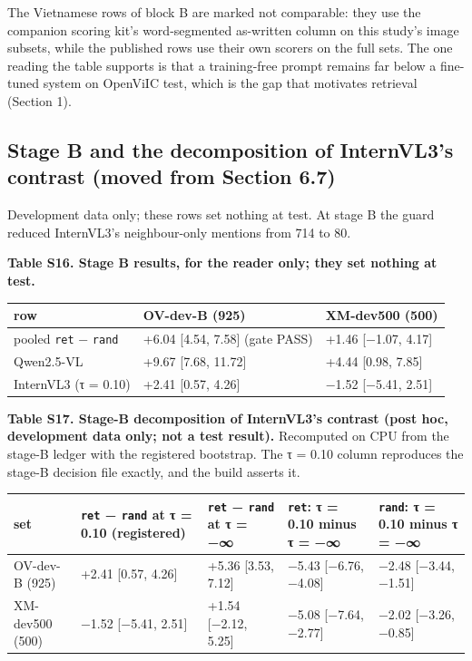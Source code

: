 The Vietnamese rows of block B are marked not comparable: they use the companion scoring kit's
word-segmented as-written column on this study's image subsets, while the published rows use their
own scorers on the full sets. The one reading the table supports is that a training-free prompt
remains far below a fine-tuned system on OpenViIC test, which is the gap that motivates retrieval
(Section 1).

\subsection{Stage B and the decomposition of InternVL3's contrast (moved from Section
6.7)}\label{stage-b-and-the-decomposition-of-internvl3s-contrast-moved-from-section-6.7}

Development data only; these rows set nothing at test. At stage B the guard reduced InternVL3's
neighbour-only mentions from 714 to 80.

\textbf{Table S16. Stage B results, for the reader only; they set nothing at test.}

\begin{longtable}[]{@{}lll@{}}
\toprule\noalign{}
row & OV-dev-B (925) & XM-dev500 (500) \\
\midrule\noalign{}
\endhead
\bottomrule\noalign{}
\endlastfoot
pooled \texttt{ret} − \texttt{rand} & +6.04 {[}4.54, 7.58{]} (gate PASS) & +1.46 {[}−1.07,
4.17{]} \\
Qwen2.5-VL & +9.67 {[}7.68, 11.72{]} & +4.44 {[}0.98, 7.85{]} \\
InternVL3 (τ = 0.10) & +2.41 {[}0.57, 4.26{]} & −1.52 {[}−5.41, 2.51{]} \\
\end{longtable}

\textbf{Table S17. Stage-B decomposition of InternVL3's contrast (post hoc, development data only;
not a test result).} Recomputed on CPU from the stage-B ledger with the registered bootstrap. The τ
= 0.10 column reproduces the stage-B decision file exactly, and the build asserts it.

\begin{longtable}[]{@{}
  >{\raggedright\arraybackslash}p{}
  >{\raggedright\arraybackslash}p{}
  >{\raggedright\arraybackslash}p{}
  >{\raggedright\arraybackslash}p{}
  >{\raggedright\arraybackslash}p{}@{}}
\toprule\noalign{}
set & \texttt{ret} − \texttt{rand} at τ = 0.10 (registered) & \texttt{ret} − \texttt{rand} at τ = −∞ & \texttt{ret}: τ = 0.10 minus τ = −∞ & \texttt{rand}: τ = 0.10 minus τ = −∞ \\
\midrule\noalign{}
\endhead
\bottomrule\noalign{}
\endlastfoot
OV-dev-B (925) & +2.41 {[}0.57, 4.26{]} & +5.36 {[}3.53, 7.12{]} & −5.43 {[}−6.76, −4.08{]} & −2.48
{[}−3.44, −1.51{]} \\
XM-dev500 (500) & −1.52 {[}−5.41, 2.51{]} & +1.54 {[}−2.12, 5.25{]} & −5.08 {[}−7.64, −2.77{]} &
−2.02 {[}−3.26, −0.85{]} \\
\end{longtable}

